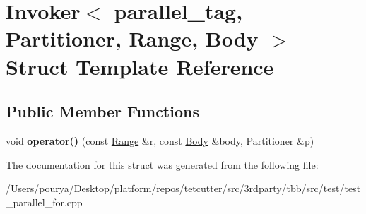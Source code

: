 \hypertarget{structInvoker_3_01parallel__tag_00_01Partitioner_00_01Range_00_01Body_01_4}{}\section{Invoker$<$ parallel\+\_\+tag, Partitioner, Range, Body $>$ Struct Template Reference}
\label{structInvoker_3_01parallel__tag_00_01Partitioner_00_01Range_00_01Body_01_4}
\subsection*{Public Member Functions}
\begin{DoxyCompactItemize}
\item 
\hypertarget{structInvoker_3_01parallel__tag_00_01Partitioner_00_01Range_00_01Body_01_4_a7dff07c16086b16db2e77681d98c4ca6}{}void {\bfseries operator()} (const \hyperlink{classtbb_1_1blocked__range}{Range} \&r, const \hyperlink{classBody}{Body} \&body, Partitioner \&p)\label{structInvoker_3_01parallel__tag_00_01Partitioner_00_01Range_00_01Body_01_4_a7dff07c16086b16db2e77681d98c4ca6}

\end{DoxyCompactItemize}


The documentation for this struct was generated from the following file\+:\begin{DoxyCompactItemize}
\item 
/\+Users/pourya/\+Desktop/platform/repos/tetcutter/src/3rdparty/tbb/src/test/test\+\_\+parallel\+\_\+for.\+cpp\end{DoxyCompactItemize}
